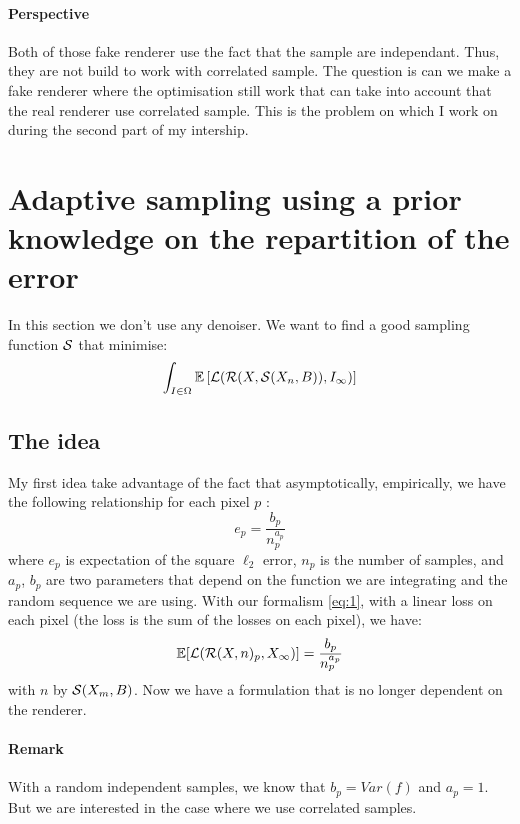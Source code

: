 \documentclass{classeENS}
\begin{document}
\paragraph*{Perspective} Both of those fake renderer use the fact that the sample are
independant. Thus, they are not build to work with correlated sample. The question is
can we make a fake renderer where the optimisation still work that can take into account
that the real renderer use correlated sample. This is the problem on which I work 
on during the second part of my intership.

\section{Adaptive sampling using a prior knowledge on the repartition of the error}

In this section we don't use any denoiser.
We want to find a good sampling function $\mathcal S$ that minimise:
\[ \int_{I\in\Omega} \mathbb E \left [ \mathcal L (\mathcal R(X, \mathcal S(X_n, B)), I_\infty) \right ] \]

\subsection{The idea}

My first idea take advantage of the fact that asymptotically, empirically, we have 
the following relationship for each pixel $p$ \cite{10.1145/237170.237265}:
\begin{equation}
    \label{eq:99}
    e_p = \frac{b_p}{n_p^{a_p}}
\end{equation}
where $e_p$ is expectation of the square $\ell_2$ error, $n_p$ is the number of samples, 
and $a_p$, $b_p$ are two parameters that depend on the function we are 
integrating and the random sequence we are using. With our formalism 
\ref{eq:1}, with a linear loss on each pixel (the loss is the sum of 
the losses on each pixel), we have:
\[ \mathbb E[\mathcal L(\mathcal R(X,n)_p, X_\infty)] = \frac{b_p}{n_p^{a_p}} \]
with $n$ by $\mathcal S(X_m, B)$. Now we have a formulation that is no longer 
dependent on the renderer.

\paragraph*{Remark} With a random independent samples, we know that $b_p = Var(f)$ and 
$a_p=1$. But we are interested in the case where we use correlated samples.
\end{document}
